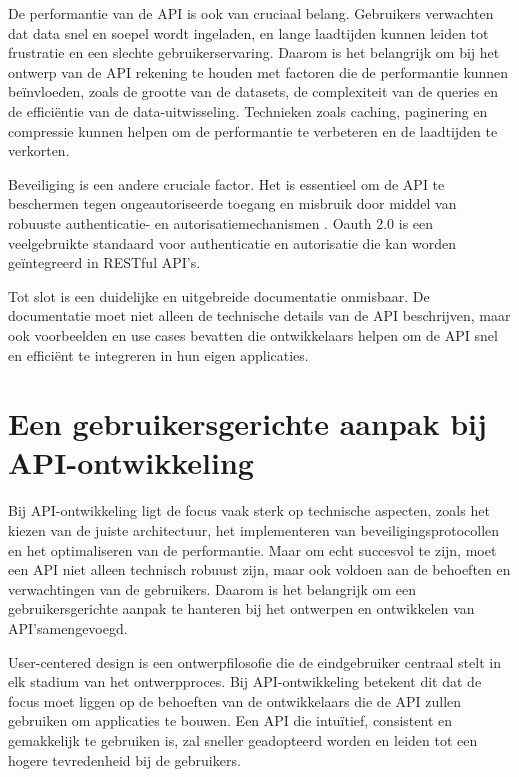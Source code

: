 \bigskip

De performantie van de API is ook van cruciaal belang. Gebruikers verwachten dat data snel en soepel wordt ingeladen, en lange laadtijden kunnen leiden tot frustratie en een slechte gebruikerservaring. Daarom is het belangrijk om bij het ontwerp van de API rekening te houden met factoren die de performantie kunnen beïnvloeden, zoals de grootte van de datasets, de complexiteit van de queries en de efficiëntie van de data-uitwisseling. Technieken zoals caching, paginering en compressie kunnen helpen om de performantie te verbeteren en de laadtijden te verkorten.

\bigskip

Beveiliging is een andere cruciale factor. Het is essentieel om de API te beschermen tegen ongeautoriseerde toegang en misbruik door middel van robuuste authenticatie- en autorisatiemechanismen \autocite{Lange2024}. Oauth 2.0 is een veelgebruikte standaard voor authenticatie en autorisatie die kan worden geïntegreerd in RESTful API's.

\bigskip

Tot slot is een duidelijke en uitgebreide documentatie onmisbaar. De documentatie moet niet alleen de technische details van de API beschrijven, maar ook voorbeelden en use cases bevatten die ontwikkelaars helpen om de API snel en efficiënt te integreren in hun eigen applicaties.

\section{Een gebruikersgerichte aanpak bij API-ontwikkeling}

Bij API-ontwikkeling ligt de focus vaak sterk op technische aspecten, zoals het kiezen van de juiste architectuur, het implementeren van beveiligingsprotocollen en het optimaliseren van de performantie. Maar om echt succesvol te zijn, moet een API niet alleen technisch robuust zijn, maar ook voldoen aan de behoeften en verwachtingen van de gebruikers. Daarom is het belangrijk om een gebruikersgerichte aanpak te hanteren bij het ontwerpen en ontwikkelen van API'samengevoegd.

\bigskip

User-centered design is een ontwerpfilosofie die de eindgebruiker centraal stelt in elk stadium van het ontwerpproces. Bij API-ontwikkeling betekent dit dat de focus moet liggen op de behoeften van de ontwikkelaars die de API zullen gebruiken om applicaties te bouwen. Een API die intuïtief, consistent en gemakkelijk te gebruiken is, zal sneller geadopteerd worden en leiden tot een hogere tevredenheid bij de gebruikers.

